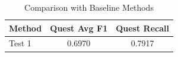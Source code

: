 
\begin{table}[h]
\centering
\caption{Comparison with Baseline Methods}
\label{tab:baseline}
\begin{tabular}{lcc}
\toprule
Method & Quest Avg F1 & Quest Recall \\
\midrule
Test 1 & 0.6970 & 0.7917 \\
\bottomrule
\end{tabular}
\end{table}
